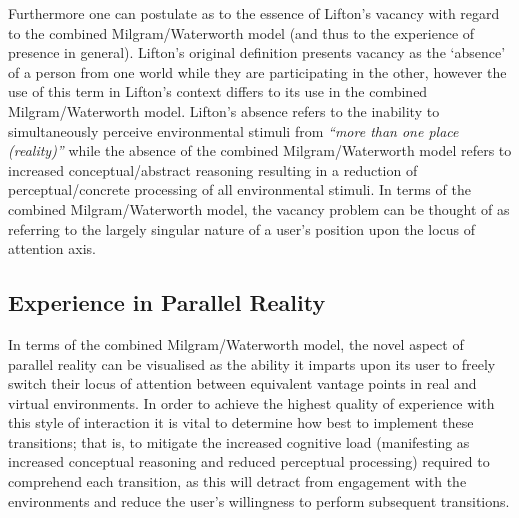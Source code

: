 Furthermore one can postulate as to the essence of Lifton's vacancy with regard to the combined Milgram/Waterworth model (and thus to the experience of presence in general). Lifton's original definition presents vacancy as the `absence' of a person from one world while they are participating in the other, however the use of this term in Lifton's context differs to its use in the combined Milgram/Waterworth model. Lifton's absence refers to the inability to simultaneously perceive environmental stimuli from \textit{``more than one place (reality)''} while the absence of the combined Milgram/Waterworth model refers to increased conceptual/abstract reasoning resulting in a reduction of perceptual/concrete processing of all environmental stimuli. In terms of the combined Milgram/Waterworth model, the vacancy problem can be thought of as referring to the largely singular nature of a user's position upon the locus of attention axis.





\subsection{Experience in Parallel Reality}

\label{transitions_in_parallel_reality}

In terms of the combined Milgram/Waterworth model, the novel aspect of parallel reality can be visualised as the ability it imparts upon its user to freely switch their locus of attention between equivalent vantage points in real and virtual environments. In order to achieve the highest quality of experience with this style of interaction it is vital to determine how best to implement these transitions; that is, to mitigate the increased cognitive load (manifesting as increased conceptual reasoning and reduced perceptual processing) required to comprehend each transition, as this will detract from engagement with the environments and reduce the user's willingness to perform subsequent transitions.

